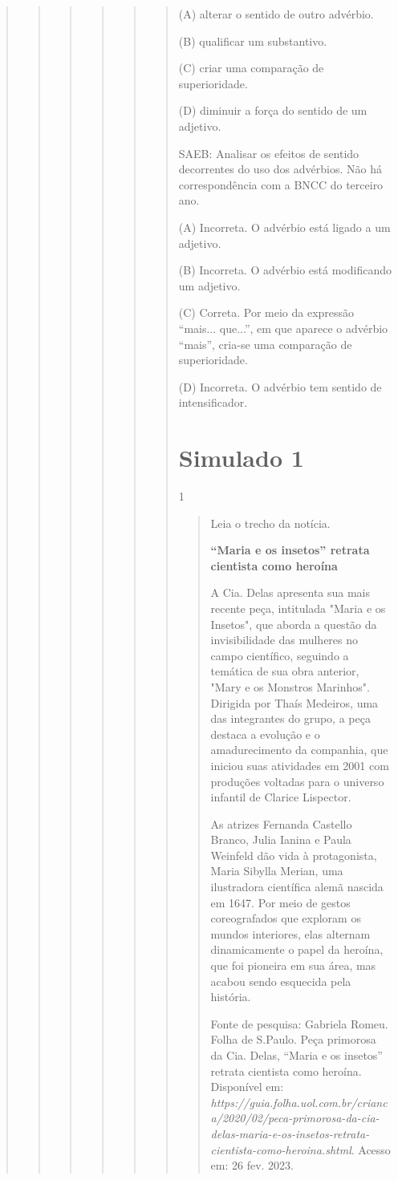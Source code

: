 \begin{boxlist}
{{\begin{quote}
\begin{quote}
\begin{quote}
{\begin{quote}
{\begin{quote}
\begin{quote}
(A) alterar o sentido de outro advérbio.

(B) qualificar um substantivo.

(C) criar uma comparação de superioridade.

(D) diminuir a força do sentido de um adjetivo.

SAEB: Analisar os efeitos de sentido decorrentes do uso dos advérbios.
Não há correspondência com a BNCC do terceiro ano.

(A) Incorreta. O advérbio está ligado a um adjetivo.

(B) Incorreta. O advérbio está modificando um adjetivo.

(C) Correta. Por meio da expressão ``mais... que...'', em que aparece o advérbio ``mais'', cria-se uma comparação de superioridade.

(D) Incorreta. O advérbio tem sentido de intensificador.


\chapter{Simulado 1}

\num{1}

\begin{quote}
Leia o trecho da notícia.

\textbf{``Maria e os insetos'' retrata cientista como heroína}

A Cia. Delas apresenta sua mais recente peça, intitulada "Maria e os Insetos", que aborda a questão da invisibilidade das mulheres no campo científico, seguindo a temática de sua obra anterior, "Mary e os Monstros Marinhos". Dirigida por Thaís Medeiros, uma das integrantes do grupo, a peça destaca a evolução e o amadurecimento da companhia, que iniciou suas atividades em 2001 com produções voltadas para o universo infantil de Clarice Lispector.

As atrizes Fernanda Castello Branco, Julia Ianina e Paula Weinfeld dão vida à protagonista, Maria Sibylla Merian, uma ilustradora científica alemã nascida em 1647. Por meio de gestos coreografados que exploram os mundos interiores, elas alternam dinamicamente o papel da heroína, que foi pioneira em sua área, mas acabou sendo esquecida pela história.

Fonte de pesquisa: Gabriela Romeu. Folha de S.Paulo. Peça primorosa da Cia. Delas, ``Maria e os insetos'' retrata cientista como heroína. Disponível em:
\emph{https://guia.folha.uol.com.br/crianca/2020/02/peca-primorosa-da-cia-delas-maria-e-os-insetos-retrata-cientista-como-heroina.shtml}.
Acesso em: 26 fev. 2023.


\end{quote}
\end{quote}
\end{quote}}
\end{quote}}
\end{quote}
\end{quote}
\end{quote}}}
\end{boxlist}
